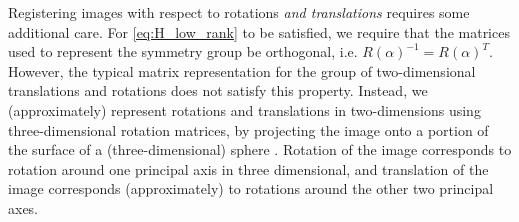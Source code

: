\documentclass{pnastwo}
\begin{document}
\begin{article}
\begin{materials}
Registering images with respect to rotations {\em and translations} requires some additional care.
%
%
For \eqref{eq:H_low_rank} to be satisfied, we require that the matrices used to represent the symmetry group be orthogonal, i.e. $R(\alpha)^{-1} = R(\alpha)^T$. 
%
However, the typical matrix representation for the group of two-dimensional translations and rotations does not satisfy this property. 
%
Instead, we (approximately) represent rotations and translations in two-dimensions using three-dimensional rotation matrices, by projecting the image onto a portion of the surface of a (three-dimensional) sphere \cite{singer2011angular}. %
%
Rotation of the image corresponds to rotation around one principal axis in three dimensional, and translation of the image corresponds (approximately) to rotations around the other two principal axes. %
%


\end{materials}
\end{article}
\end{document}
